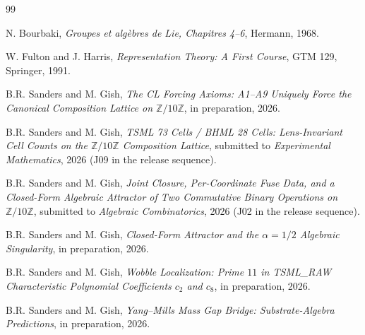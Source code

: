 \documentclass[11pt,reqno]{amsart}
\theoremstyle{definition}
\newcommand{\Z}{\mathbb{Z}}
\begin{document}
\begin{thebibliography}{99}

N. Bourbaki, \emph{Groupes et alg\`ebres de Lie, Chapitres 4--6},
Hermann, 1968.

W. Fulton and J. Harris, \emph{Representation Theory: A First
Course}, GTM 129, Springer, 1991.

B.R. Sanders and M. Gish, \emph{The CL Forcing Axioms: A1--A9
Uniquely Force the Canonical Composition Lattice on $\Z/10\Z$},
in preparation, 2026.

B.R. Sanders and M. Gish, \emph{TSML 73 Cells / BHML 28 Cells:
Lens-Invariant Cell Counts on the $\Z/10\Z$ Composition Lattice},
submitted to \emph{Experimental Mathematics}, 2026 (J09 in the
release sequence).

B.R. Sanders and M. Gish, \emph{Joint Closure, Per-Coordinate Fuse
Data, and a Closed-Form Algebraic Attractor of Two Commutative
Binary Operations on $\Z/10\Z$}, submitted to \emph{Algebraic
Combinatorics}, 2026 (J02 in the release sequence).

B.R. Sanders and M. Gish, \emph{Closed-Form Attractor and the
$\alpha = 1/2$ Algebraic Singularity}, in preparation, 2026.

B.R. Sanders and M. Gish, \emph{Wobble Localization: Prime $11$ in
TSML\_RAW Characteristic Polynomial Coefficients $c_2$ and $c_8$},
in preparation, 2026.

B.R. Sanders and M. Gish, \emph{Yang--Mills Mass Gap Bridge:
Substrate-Algebra Predictions}, in preparation, 2026.

\end{thebibliography}
\end{document}
